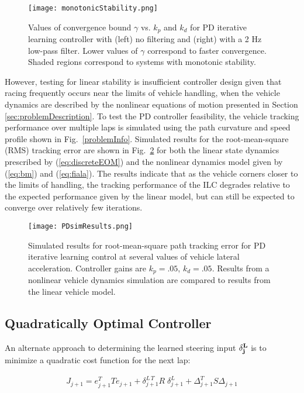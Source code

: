 \documentclass[letterpaper, 10 pt, conference]{ieeeconf}  %
\begin{document}
\begin{figure}
\centering
\texttt{[image: monotonicStability.png]}
\caption{Values of convergence bound $\gamma$ vs. $k_p$ and $k_d$ for PD iterative learning controller with (left) no filtering and (right) with a 2 Hz low-pass filter. Lower values of $\gamma$ correspond to faster convergence.
Shaded regions correspond to systems with monotonic stability. }
\label{fig:stabPlot}
\end{figure}

However, testing for linear stability is insufficient controller design given that racing frequently occurs near the limits of vehicle handling, when the vehicle dynamics are described 
by the nonlinear equations of motion presented in Section \ref{sec:problemDescription}. To test the PD controller feasibility, the vehicle tracking performance over multiple laps is
simulated using the path curvature and speed profile shown in Fig.~\ref{problemInfo}.
Simulated results for the root-mean-square (RMS) tracking error are shown in Fig.~\ref{fig:PDsimResults} for both the linear state dynamics prescribed by (\ref{eq:discreteEOM}) and 
the nonlinear dynamics model given by (\ref{eq:bm})
and (\ref{eq:fiala}). The results indicate that as the vehicle corners closer to the limits of handling, the tracking performance of the ILC degrades relative to the expected performance
given by the linear model, but can still be expected to converge over relatively few iterations. 

\begin{figure}
\centering
\texttt{[image: PDsimResults.png]}
\caption{Simulated results for root-mean-square path tracking error for PD iterative learning control at several values of vehicle lateral acceleration. Controller gains are $k_p = .05$, $k_d = .05$. Results from a nonlinear vehicle dynamics simulation are compared to results
from the linear vehicle model. }
\label{fig:PDsimResults}
\end{figure}

\subsection{Quadratically Optimal Controller}\label{sec:controller}

An alternate approach to determining the learned steering input $\bf{\delta}^L_j$ is to minimize a quadratic cost function for the next lap:

\begin{align}
J_{j\!+\!1} = e_{j\!+\!1}^TTe_{j\!+\!1} + \delta^{L\,T}_{j\!+\!1} R \; \delta^L_{j\!+\!1}+\Delta_{j\!+\!1}^TS\Delta_{j\!+\!1}
\label{eq:QILC}
\end{align}
\end{document}
